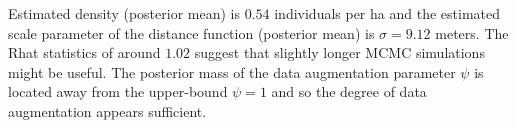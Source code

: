 Estimated density (posterior mean) is $0.54$ individuals 
  per ha and the estimated scale parameter of the distance function
(posterior mean) is $\sigma=9.12$ meters.  The Rhat statistics of
around $1.02$ suggest that slightly longer MCMC simulations might be
useful. The posterior mass of the data augmentation parameter $\psi$
is located away from the upper-bound $\psi=1$ and so the degree of
data augmentation appears sufficient.

